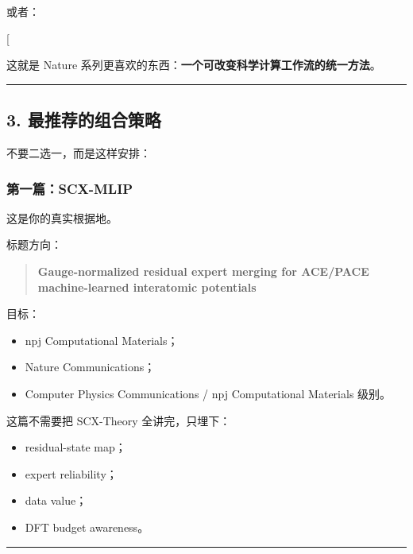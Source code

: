 \documentclass[
  12pt,
]{ctexart}
\providecommand{\tightlist}{%
  \setlength{\itemsep}{0pt}\setlength{\parskip}{0pt}}
\begin{document}
或者：

{[}
\text{SCX routing saves simulation cost while preserving accuracy}{]}

这就是 Nature
系列更喜欢的东西：\textbf{一个可改变科学计算工作流的统一方法}。

\begin{center}\rule{0.5\linewidth}{0.5pt}\end{center}

\subsection{3.
最推荐的组合策略}\label{ux6700ux63a8ux8350ux7684ux7ec4ux5408ux7b56ux7565}

不要二选一，而是这样安排：

\subsubsection{第一篇：SCX-MLIP}\label{ux7b2cux4e00ux7bc7scx-mlip}

这是你的真实根据地。

标题方向：

\begin{quote}
\textbf{Gauge-normalized residual expert merging for ACE/PACE
machine-learned interatomic potentials}
\end{quote}

目标：

\begin{itemize}
\tightlist
\item
  npj Computational Materials；
\item
  Nature Communications；
\item
  Computer Physics Communications / npj Computational Materials 级别。
\end{itemize}

这篇不需要把 SCX-Theory 全讲完，只埋下：

\begin{itemize}
\tightlist
\item
  residual-state map；
\item
  expert reliability；
\item
  data value；
\item
  DFT budget awareness。
\end{itemize}

\begin{center}\rule{0.5\linewidth}{0.5pt}\end{center}
\end{document}
